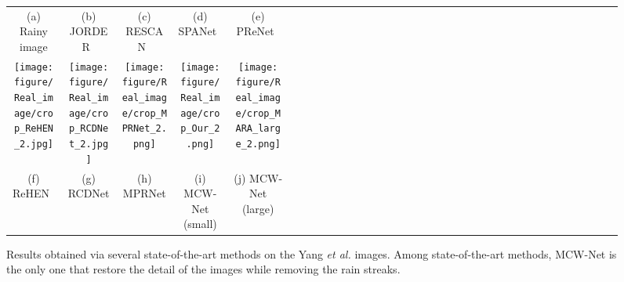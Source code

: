 \documentclass[a4paper,fleqn]{cas-dc}
\begin{document}
\begin{figure*}
{\begin{tabular}{cccccccclcccccccclcccccccclcccccccclccccccccl}
		
		\multicolumn{3}{c}{(a) Rainy image} &
		\multicolumn{3}{c}{(b) JORDER~\cite{yang2017deep}} &
		\multicolumn{3}{c}{(c) RESCAN~\cite{li2018recurrent}} &
		\multicolumn{3}{c}{(d) SPANet~\cite{wang2019spatial}} &
		\multicolumn{3}{c}{(e) PReNet~\cite{ren2019progressive} } \\

		
		\multicolumn{3}{c}{\texttt{[image: figure/Real\_image/crop\_ReHEN\_2.jpg]}}\ &
		\multicolumn{3}{c}{\texttt{[image: figure/Real\_image/crop\_RCDNet\_2.jpg]}}\ &
		\multicolumn{3}{c}{\texttt{[image: figure/Real\_image/crop\_MPRNet\_2.png]}}\ &
		\multicolumn{3}{c}{\texttt{[image: figure/Real\_image/crop\_Our\_2.png]}}\ &
		\multicolumn{3}{c}{\texttt{[image: figure/Real\_image/crop\_MARA\_large\_2.png]}}\\

		\multicolumn{3}{c}{(f) ReHEN~\cite{yang2019single}} &		
		\multicolumn{3}{c}{(g) RCDNet~\cite{wang2020model}} &
		\multicolumn{3}{c}{(h) MPRNet~\cite{zamir2021multi}} &
		\multicolumn{3}{c}{(i) MCW-Net (small)} &
		\multicolumn{3}{c}{(j) MCW-Net (large)} \\
	\end{tabular}}
	\caption{Results obtained via several state-of-the-art methods on the Yang \textit{et al.} \cite{yang2017deep} images. Among state-of-the-art methods, MCW-Net is the only one that restore the detail of the images while removing the rain streaks.}
	\label{fig:results real}
\end{figure*}
\end{document}
